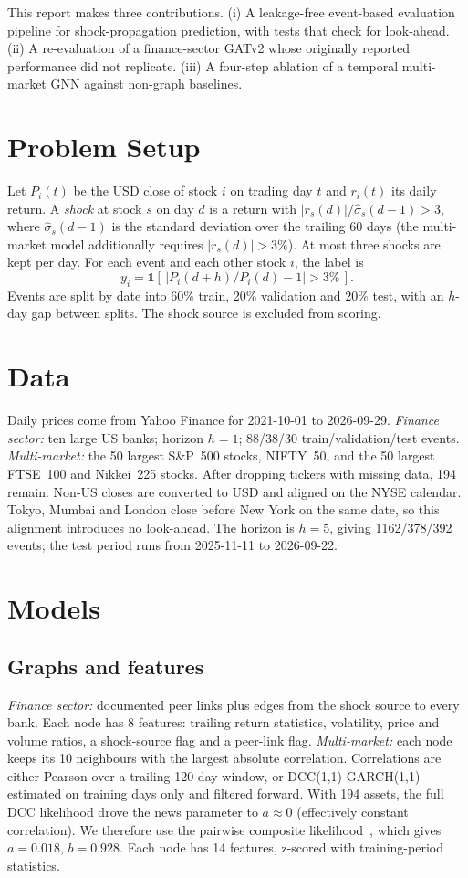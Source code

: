 \documentclass[conference]{IEEEtran}
\begin{document}
This report makes three contributions. (i) A leakage-free event-based evaluation pipeline
for shock-propagation prediction, with tests that check for look-ahead. (ii) A
re-evaluation of a finance-sector GATv2 whose originally reported performance did not
replicate. (iii) A four-step ablation of a temporal multi-market GNN against
non-graph baselines.

\section{Problem Setup}
Let $P_i(t)$ be the USD close of stock $i$ on trading day $t$ and $r_i(t)$ its daily return.
A \emph{shock} at stock $s$ on day $d$ is a return with $|r_s(d)|/\hat\sigma_s(d-1) > 3$,
where $\hat\sigma_s(d-1)$ is the standard deviation over the trailing 60 days (the multi-market model
additionally requires $|r_s(d)| > 3\%$). At most three shocks are kept per day. For each
event and each other stock $i$, the label is
\begin{equation}
y_i = \mathbb{1}\left[\,\left|P_i(d+h)/P_i(d) - 1\right| > 3\%\,\right].
\end{equation}
Events are split by date into 60\% train, 20\% validation and 20\% test, with an $h$-day gap
between splits. The shock source is excluded from scoring.

\section{Data}
Daily prices come from Yahoo Finance for 2021-10-01 to 2026-09-29. \emph{Finance sector:}
ten large US banks; horizon $h=1$; 88/38/30 train/validation/test events. \emph{Multi-market:}
the 50 largest S\&P~500 stocks, NIFTY~50, and the 50 largest FTSE~100 and Nikkei~225 stocks.
After dropping tickers with missing data, 194 remain. Non-US closes are converted to USD and
aligned on the NYSE calendar. Tokyo, Mumbai and London close before New York on the same
date, so this alignment introduces no look-ahead. The horizon is $h=5$, giving
1162/378/392 events; the test period runs from 2025-11-11 to 2026-09-22.

\section{Models}
\subsection{Graphs and features}
\emph{Finance sector:} documented peer links plus edges from the shock source to every bank.
Each node has 8 features: trailing return statistics, volatility, price and volume ratios, a
shock-source flag and a peer-link flag. \emph{Multi-market:} each node keeps its 10 neighbours
with the largest absolute correlation. Correlations are either Pearson over a trailing
120-day window, or DCC(1,1)-GARCH(1,1)~\cite{engle2002} estimated on training days only and
filtered forward. With 194 assets, the full DCC likelihood drove the news parameter to
$a\approx 0$ (effectively constant correlation). We therefore use the pairwise composite
likelihood~\cite{pakel2021}, which gives $a=0.018$, $b=0.928$. Each node has 14 features,
z-scored with training-period statistics.
\end{document}

